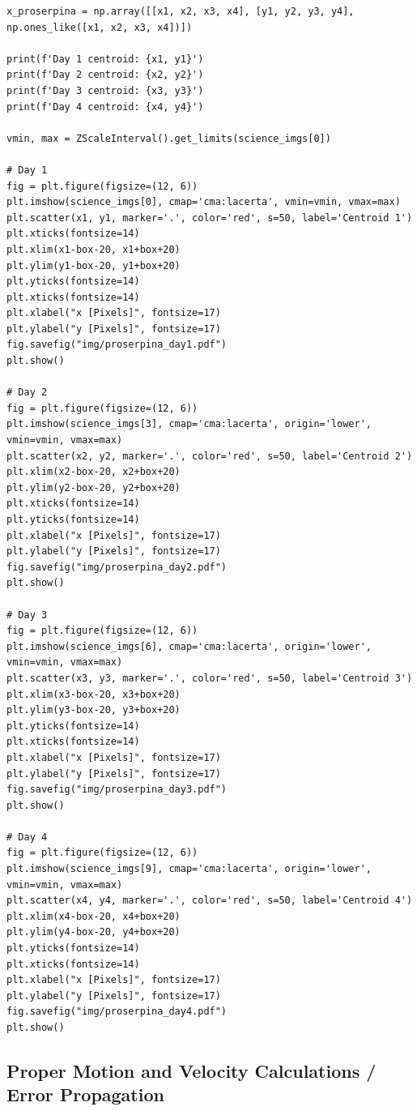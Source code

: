 \documentclass{article}
\begin{document}
\begin{appendices}
\begin{small}
\begin{verbatim}
x_proserpina = np.array([[x1, x2, x3, x4], [y1, y2, y3, y4], np.ones_like([x1, x2, x3, x4])])

print(f'Day 1 centroid: {x1, y1}')
print(f'Day 2 centroid: {x2, y2}')
print(f'Day 3 centroid: {x3, y3}')
print(f'Day 4 centroid: {x4, y4}')

vmin, max = ZScaleInterval().get_limits(science_imgs[0])

# Day 1 
fig = plt.figure(figsize=(12, 6))
plt.imshow(science_imgs[0], cmap='cma:lacerta', vmin=vmin, vmax=max)
plt.scatter(x1, y1, marker='.', color='red', s=50, label='Centroid 1')
plt.xticks(fontsize=14)
plt.xlim(x1-box-20, x1+box+20)
plt.ylim(y1-box-20, y1+box+20)
plt.yticks(fontsize=14)
plt.xticks(fontsize=14)
plt.xlabel("x [Pixels]", fontsize=17)
plt.ylabel("y [Pixels]", fontsize=17)
fig.savefig("img/proserpina_day1.pdf")
plt.show()

# Day 2
fig = plt.figure(figsize=(12, 6))
plt.imshow(science_imgs[3], cmap='cma:lacerta', origin='lower', vmin=vmin, vmax=max)
plt.scatter(x2, y2, marker='.', color='red', s=50, label='Centroid 2')
plt.xlim(x2-box-20, x2+box+20)
plt.ylim(y2-box-20, y2+box+20)
plt.xticks(fontsize=14)
plt.yticks(fontsize=14)
plt.xlabel("x [Pixels]", fontsize=17)
plt.ylabel("y [Pixels]", fontsize=17)
fig.savefig("img/proserpina_day2.pdf")
plt.show()

# Day 3
fig = plt.figure(figsize=(12, 6))
plt.imshow(science_imgs[6], cmap='cma:lacerta', origin='lower', vmin=vmin, vmax=max)
plt.scatter(x3, y3, marker='.', color='red', s=50, label='Centroid 3')
plt.xlim(x3-box-20, x3+box+20)
plt.ylim(y3-box-20, y3+box+20)
plt.yticks(fontsize=14)
plt.xticks(fontsize=14)
plt.xlabel("x [Pixels]", fontsize=17)
plt.ylabel("y [Pixels]", fontsize=17)
fig.savefig("img/proserpina_day3.pdf")
plt.show()

# Day 4
fig = plt.figure(figsize=(12, 6))
plt.imshow(science_imgs[9], cmap='cma:lacerta', origin='lower', vmin=vmin, vmax=max)
plt.scatter(x4, y4, marker='.', color='red', s=50, label='Centroid 4')
plt.xlim(x4-box-20, x4+box+20)
plt.ylim(y4-box-20, y4+box+20)
plt.yticks(fontsize=14)
plt.xticks(fontsize=14)
plt.xlabel("x [Pixels]", fontsize=17)
plt.ylabel("y [Pixels]", fontsize=17)
fig.savefig("img/proserpina_day4.pdf")
plt.show()

\end{verbatim}
\end{small}

\subsection{Proper Motion and Velocity Calculations / Error Propagation}
\begin{small}
\begin{verbatim}


\end{verbatim}
\end{small}
\end{appendices}
\end{document}
